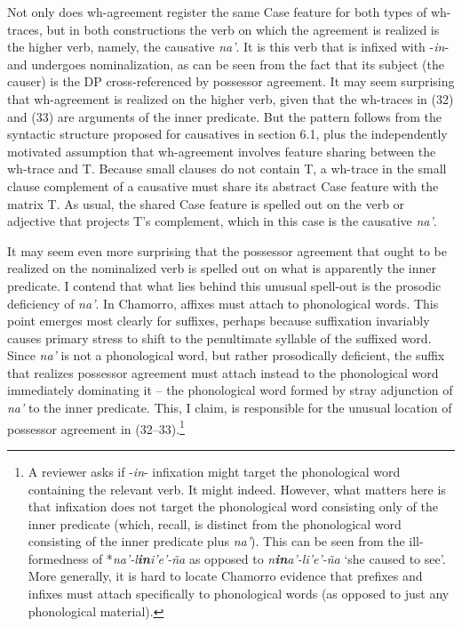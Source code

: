 \documentclass[output=paper,
modfonts
]{LSP/langsci}
\begin{document}
\begin{exe}
\begin{xlist}
Not only does wh-agreement register the same Case feature for both types
of wh-traces, but in both constructions the verb on which the agreement
is realized is the higher verb, namely, the causative \emph{na'}. It is
this verb that is infixed with -\emph{in}- and undergoes nominalization,
as can be seen from the fact that its subject (the causer) is the DP
cross-referenced by possessor agreement. It may seem surprising that
wh-agreement is realized on the higher verb, given that the wh-traces in
(32) and (33) are arguments of the inner predicate. But the pattern
follows from the syntactic structure proposed for causatives in section
6.1, plus the independently motivated assumption that wh-agreement
involves feature sharing between the wh-trace and T. Because small
clauses do not contain T, a wh-trace in the small clause complement of a
causative must share its abstract Case feature with the matrix T. As
usual, the shared Case feature is spelled out on the verb or adjective
that projects T's complement, which in this case is the causative
\emph{na'}.

It may seem even more surprising that the possessor agreement that ought
to be realized on the nominalized verb is spelled out on what is
apparently the inner predicate. I contend that what lies behind this
unusual spell-out is the prosodic deficiency of \emph{na'}. In Chamorro,
affixes must attach to phonological words. This point emerges most
clearly for suffixes, perhaps because suffixation invariably causes
primary stress to shift to the penultimate syllable of the suffixed
word. Since \emph{na'} is not a phonological word, but rather
prosodically deficient, the suffix that realizes possessor agreement
must attach instead to the phonological word immediately dominating
it -- the phonological word formed by stray adjunction of \emph{na'} to
the inner predicate. This, I claim, is responsible for the unusual
location of possessor agreement in (32--33).\footnote{A reviewer asks if
  -\emph{in}- infixation might target the phonological word containing
  the relevant verb. It might indeed. However, what matters here is that
  infixation does not target the phonological word consisting only of
  the inner predicate (which, recall, is distinct from the phonological
  word consisting of the inner predicate plus \emph{na'}). This can be
  seen from the ill-formedness of *\emph{na'-l\textbf{in}i'e'-ña} as
  opposed to \emph{n\textbf{in}a'-li'e'-ña} `she caused to see'. More
  generally, it is hard to locate Chamorro evidence that prefixes and
  infixes must attach specifically to phonological words (as opposed to
  just any phonological material).}


\end{xlist}
\end{exe}
\end{document}
